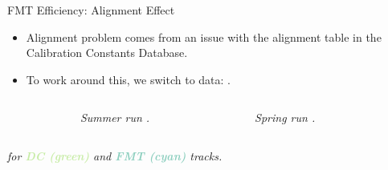 \begin{frame}{FMT Efficiency: Alignment Effect}
    \label{11.42::alignment_effect}

    \begin{itemize}
        \item
            Alignment problem comes from an issue with the  alignment table in the Calibration Constants Database.

        \item
            To work around this, we switch to  data: .
    \end{itemize}

    \vspace{-12pt}
    \begin{columns}[onlytextwidth,T]

    \begin{column}{.05\linewidth}\end{column} %

    \begin{column}{.35\linewidth}
        \begin{center}
            \begin{figure}[t]
                \scriptsize{\textit{Summer run .}}
            \end{figure}
        \end{center}
    \end{column}

    \begin{column}{.35\linewidth}
        \begin{center}
            \begin{figure}[t]
                \scriptsize{\textit{Spring run .}}
            \end{figure}
        \end{center}
    \end{column}

    \begin{column}{.05\linewidth}\end{column} %

    \end{columns}
    \begin{center}
        \scriptsize{\textit{
             for \textbf{\textcolor[HTML]{c7eca6}{DC (green)}} and \textbf{\textcolor[HTML]{8dcfbf}{FMT (cyan)}} tracks.
        }}
    \end{center}
\end{frame}

